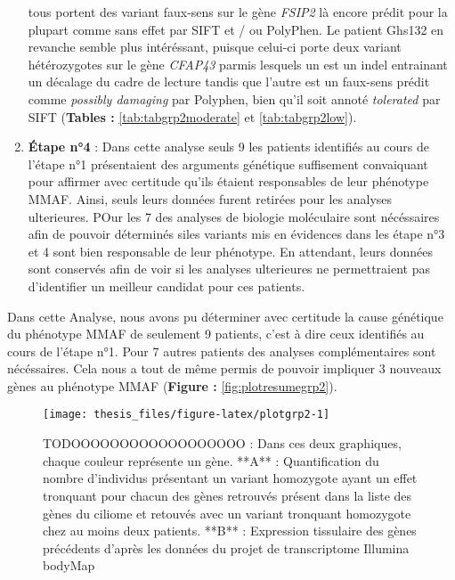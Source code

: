 \documentclass[12pt,twoside]{reedthesis}
\theoremstyle{definition}
\theoremstyle{definition}
\theoremstyle{remark}
\begin{document}
\begin{enumerate}
    tous portent des variant faux-sens sur le gène \emph{FSIP2} là encore
    prédit pour la plupart comme sans effet par SIFT et / ou PolyPhen. Le
    patient Ghs132 en revanche semble plus intéréssant, puisque celui-ci
    porte deux variant hétérozygotes sur le gène \emph{CFAP43} parmis
    lesquels un est un indel entrainant un décalage du cadre de lecture
    tandis que l'autre est un faux-sens prédit comme \emph{possibly
    damaging} par Polyphen, bien qu'il soit annoté \emph{tolerated} par
    SIFT (\textbf{Tables : }\ref{tab:tabgrp2moderate} et
    \ref{tab:tabgrp2low}).
  \item
    \textbf{Étape n°4} : Dans cette analyse seuls 9 les patients
    identifiés au cours de l'étape n°1 présentaient des arguments
    génétique suffisement convaiquant pour affirmer avec certitude qu'ils
    étaient responsables de leur phénotype MMAF. Ainsi, seuls leurs
    données furent retirées pour les analyses ulterieures. POur les 7 des
    analyses de biologie moléculaire sont nécéssaires afin de pouvoir
    déterminés siles variants mis en évidences dans les étape n°3 et 4
    sont bien responsable de leur phénotype. En attendant, leurs données
    sont conservés afin de voir si les analyses ulterieures ne
    permettraient pas d'identifier un meilleur candidat pour ces patients.
  \end{enumerate}
  
  Dans cette Analyse, nous avons pu déterminer avec certitude la cause
  génétique du phénotype MMAF de seulement 9 patients, c'est à dire ceux
  identifiés au cours de l'étape n°1. Pour 7 autres patients des analyses
  complémentaires sont nécéssaires. Cela nous a tout de même permis de
  pouvoir impliquer 3 nouveaux gènes au phénotype MMAF (\textbf{Figure :}
  \ref{fig:plotresumegrp2}).
  
  \newpage  
  
  \begin{figure}
  
  {\centering \texttt{[image: thesis\_files/figure-latex/plotgrp2-1]} 
  
  }
  
  \caption[TODOOOOOOOOOOOOOOOOOO]{TODOOOOOOOOOOOOOOOOOO : Dans ces deux graphiques, chaque couleur représente un gène. **A** : Quantification du nombre d'individus présentant un variant homozygote ayant un effet tronquant pour chacun des gènes retrouvés présent dans la liste des gènes du ciliome et retouvés avec un variant tronquant homozygote chez au moins deux patients. **B** : Expression tissulaire des gènes précédents d'après les données du projet de transcriptome Illumina bodyMap}\label{fig:plotgrp2}
  \end{figure}
  
\end{document}
